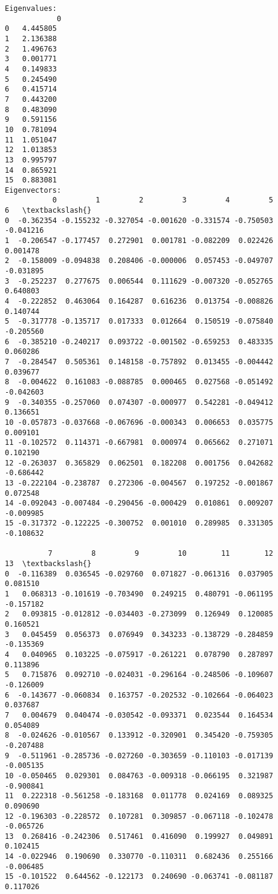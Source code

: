 \documentclass[11pt]{article}
\begin{document}
    \begin{Verbatim}[commandchars=\\\{\}]
Eigenvalues: 
            0
0   4.445805
1   2.136388
2   1.496763
3   0.001771
4   0.149833
5   0.245490
6   0.415714
7   0.443200
8   0.483090
9   0.591156
10  0.781094
11  1.051047
12  1.013853
13  0.995797
14  0.865921
15  0.883081
Eigenvectors: 
           0         1         2         3         4         5         6   \textbackslash{}
0  -0.362354 -0.155232 -0.327054 -0.001620 -0.331574 -0.750503 -0.041216   
1  -0.206547 -0.177457  0.272901  0.001781 -0.082209  0.022426  0.001478   
2  -0.158009 -0.094838  0.208406 -0.000006  0.057453 -0.049707 -0.031895   
3  -0.252237  0.277675  0.006544  0.111629 -0.007320 -0.052765  0.640803   
4  -0.222852  0.463064  0.164287  0.616236  0.013754 -0.008826  0.140744   
5  -0.317778 -0.135717  0.017333  0.012664  0.150519 -0.075840 -0.205560   
6  -0.385210 -0.240217  0.093722 -0.001502 -0.659253  0.483335  0.060286   
7  -0.284547  0.505361  0.148158 -0.757892  0.013455 -0.004442  0.039677   
8  -0.004622  0.161083 -0.088785  0.000465  0.027568 -0.051492 -0.042603   
9  -0.340355 -0.257060  0.074307 -0.000977  0.542281 -0.049412  0.136651   
10 -0.057873 -0.037668 -0.067696 -0.000343  0.006653  0.035775  0.009101   
11 -0.102572  0.114371 -0.667981  0.000974  0.065662  0.271071  0.102190   
12 -0.263037  0.365829  0.062501  0.182208  0.001756  0.042682 -0.686442   
13 -0.222104 -0.238787  0.272306 -0.004567  0.197252 -0.001867  0.072548   
14 -0.092043 -0.007484 -0.290456 -0.000429  0.010861  0.009207 -0.009985   
15 -0.317372 -0.122225 -0.300752  0.001010  0.289985  0.331305 -0.108632   

          7         8         9         10        11        12        13  \textbackslash{}
0  -0.116389  0.036545 -0.029760  0.071827 -0.061316  0.037905  0.081510   
1   0.068313 -0.101619 -0.703490  0.249215  0.480791 -0.061195 -0.157182   
2   0.093815 -0.012812 -0.034403 -0.273099  0.126949  0.120085  0.160521   
3   0.045459  0.056373  0.076949  0.343233 -0.138729 -0.284859 -0.135369   
4   0.040965  0.103225 -0.075917 -0.261221  0.078790  0.287897  0.113896   
5   0.715876  0.092710 -0.024031 -0.296164 -0.248506 -0.109607 -0.126009   
6  -0.143677 -0.060834  0.163757 -0.202532 -0.102664 -0.064023  0.037687   
7   0.004679  0.040474 -0.030542 -0.093371  0.023544  0.164534  0.054089   
8  -0.024626 -0.010567  0.133912 -0.320901  0.345420 -0.759305 -0.207488   
9  -0.511961 -0.285736 -0.027260 -0.303659 -0.110103 -0.017139 -0.005135   
10 -0.050465  0.029301  0.084763 -0.009318 -0.066195  0.321987 -0.900841   
11  0.222318 -0.561258 -0.183168  0.011778  0.024169  0.089325  0.090690   
12 -0.196303 -0.228572  0.107281  0.309857 -0.067118 -0.102478 -0.065726   
13  0.268416 -0.242306  0.517461  0.416090  0.199927  0.049891  0.102415   
14 -0.022946  0.190690  0.330770 -0.110311  0.682436  0.255166 -0.006485   
15 -0.101522  0.644562 -0.122173  0.240690 -0.063741 -0.081187  0.117026   


\end{Verbatim}
\end{document}
